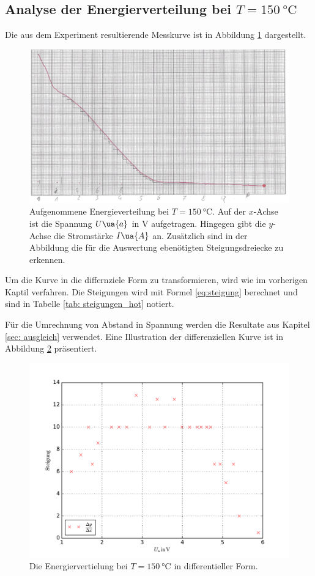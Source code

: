 \subsection{Analyse der Energierverteilung bei $T=\SI{150}{\celsius}$}
\FloatBarrier
Die aus dem Experiment resultierende Messkurve ist in Abbildung \ref{fig: messkurve_energie_hot} dargestellt. \\
\begin{figure}
  \centering
  \includegraphics[width=0.8 \textwidth]{./pics/energieverteilung_hot.png}
  \caption{Aufgenommene Energieverteilung bei $T=\SI{150}{\celsius}$. Auf der $x$-Achse ist die Spannung $U\ua{a}$ in $\si{\volt}$ aufgetragen.
          Hingegen gibt die $y$-Achse die Stromstärke $I\ua{A}$ an. Zusätzlich sind in der Abbildung die für die Auswertung ebenötigten Steigungsdreiecke zu erkennen.}
  \label{fig: messkurve_energie_hot}
\end{figure}
Um die Kurve in die differnziele Form zu transformieren, wird wie im vorherigen Kaptil verfahren.
Die Steigungen wird mit Formel \eqref{eq:steigung} berechnet und sind in Tabelle \ref{tab: steigungen_hot} notiert.

Für die Umrechnung von Abstand in Spannung werden die Resultate aus Kapitel \ref{sec: ausgleich} verwendet.
Eine Illustration der differenziellen Kurve ist in Abbildung \ref{fig: energie_hot_diff} präsentiert.
\begin{figure}
  \centering
  \includegraphics[width=0.9 \textwidth]{../Messdaten/energie_hot.pdf}
  \caption{Die Energiervertielung bei $T=\SI{150}{\celsius}$ in differentieller Form.}
  \label{fig: energie_hot_diff}
\end{figure}

